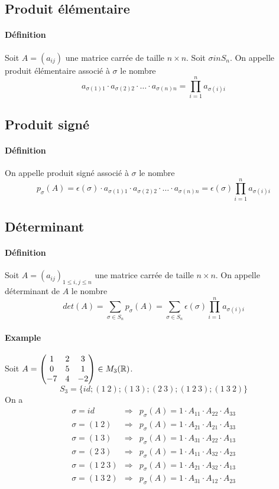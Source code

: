 %
\subsection{Produit élémentaire}
%
\paragraph{Définition} Soit $A = (a_{ij})$ une matrice carrée de taille $n\times n$. Soit $\sigma in S_n$. On appelle produit élémentaire associé à $\sigma$ le nombre
$$a_{\sigma(1) 1} \cdot a_{\sigma(2) 2} \cdot \ldots \cdot a_{\sigma(n) n} = \prod_{i=1}^{n} a_{\sigma(i) i}$$
%
\subsection{Produit signé}
%
\paragraph{Définition} On appelle produit signé associé à $\sigma$ le nombre 
$$p_{\sigma}(A) = \epsilon(\sigma) \cdot a_{\sigma(1) 1} \cdot a_{\sigma(2) 2} \cdot \ldots \cdot a_{\sigma(n) n} = \epsilon(\sigma) \prod_{i=1}^{n} a_{\sigma(i) i}$$

%
\subsection{Déterminant}
%
\paragraph{Définition} Soit $A = (a_{ij})_{1 \leq i, j \leq n}$ une matrice carrée de taille $n \times n$. On appelle déterminant de $A$ le nombre
$$det(A) = \sum_{\sigma \in S_n} p_{\sigma}(A) = \sum_{\sigma \in S_n} \epsilon(\sigma) \prod_{i=1}^{n} a_{\sigma(i) i}$$

\paragraph{Example} Soit $A = \begin{pmatrix} 1 & 2 & 3 \\ 0 & 5 & 1 \\ -7 & 4 & -2 \end{pmatrix} \in M_{3}(\mathbb{R})$.
$$S_3 = \{id; (1 ~ 2); (1 ~ 3); (2 ~ 3); (1 ~ 2 ~ 3); (1 ~ 3 ~ 2)\}$$
On a 
\begin{eqnarray*}
  \sigma = id           &\Rightarrow& p_{\sigma}(A) = 1 \cdot A_{11} \cdot A_{22} \cdot A_{33} \\
  \sigma = (1 ~ 2)      &\Rightarrow& p_{\sigma}(A) = 1 \cdot A_{21} \cdot A_{21} \cdot A_{33} \\
  \sigma = (1 ~ 3)      &\Rightarrow& p_{\sigma}(A) = 1 \cdot A_{31} \cdot A_{22} \cdot A_{13} \\
  \sigma = (2 ~ 3)      &\Rightarrow& p_{\sigma}(A) = 1 \cdot A_{11} \cdot A_{32} \cdot A_{23} \\
  \sigma = (1 ~ 2 ~ 3)  &\Rightarrow& p_{\sigma}(A) = 1 \cdot A_{21} \cdot A_{32} \cdot A_{13} \\
  \sigma = (1 ~ 3 ~ 2)  &\Rightarrow& p_{\sigma}(A) = 1 \cdot A_{31} \cdot A_{12} \cdot A_{23}
\end{eqnarray*}

